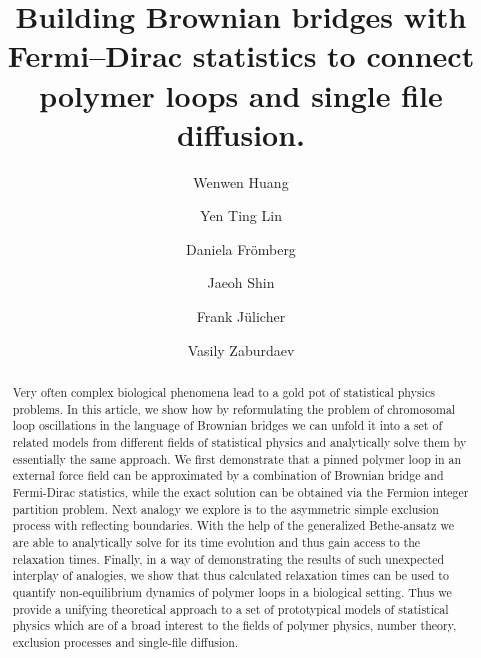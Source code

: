 \documentclass[aps,showpacs,twocolumn,floatfix,prx,superscriptaddress]{revtex4-1}
\begin{document}
\title{Building Brownian bridges with Fermi--Dirac statistics to connect polymer loops and single file diffusion.}

\author{Wenwen Huang}
\author{Yen Ting Lin}
\author{Daniela Fr\"{o}mberg}
\author{Jaeoh Shin}
\author{Frank J\"{u}licher}
\author{Vasily Zaburdaev}


\begin{abstract}
{Very often complex biological phenomena lead to a gold pot of statistical physics problems. In this article, we show how by reformulating the problem of chromosomal loop oscillations in the language of Brownian bridges we can unfold it into a set of related models from different fields of statistical physics and analytically solve them by essentially the same approach. We first demonstrate that a pinned polymer loop in an external force field can be approximated by a combination of Brownian bridge and Fermi-Dirac statistics, while the exact solution can be obtained via the Fermion integer partition problem. Next analogy we explore is to the asymmetric simple exclusion process with reflecting boundaries. With the help of the generalized Bethe-ansatz we are able to analytically solve for its time evolution and thus gain access to the relaxation times. Finally, in a way of demonstrating the results of such unexpected interplay of analogies, we show that thus calculated relaxation times can be used to quantify non-equilibrium dynamics of polymer loops in a biological setting. Thus we provide a unifying theoretical approach to a set of prototypical models of statistical physics which are of a broad interest to the fields of polymer physics, number theory, exclusion processes and single-file diffusion.}
\end{abstract}
\maketitle
\end{document}
